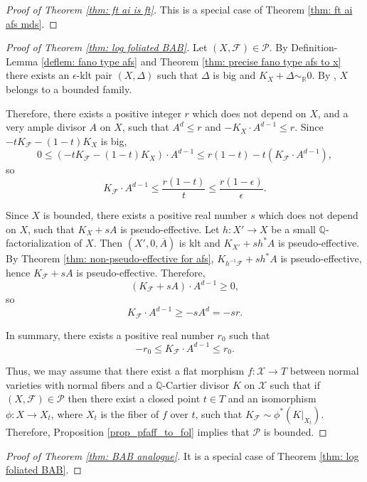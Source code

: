 \documentclass[12pt]{amsart}
\numberwithin{equation}{section}
\newcommand{\Ff}{\mathcal{F}}
\theoremstyle{definition}
\theoremstyle{definition}
\theoremstyle{definition}
\begin{document}
\begin{proof}[Proof of Theorem \ref{thm: ft ai is ft}]
  This is a special case of Theorem \ref{thm: ft ai afs mds}.
\end{proof}


\begin{proof}[Proof of Theorem \ref{thm: log foliated BAB}]
Let $(X,\mathcal F)\in \mathcal P$. 
By Definition-Lemma \ref{deflem: fano type afs} and Theorem \ref{thm: precise fano type afs to x} there exists an $\epsilon$-klt pair $(X,\Delta)$ such that $\Delta$ is big and $K_X+\Delta\sim_{\mathbb R}0$. By \cite[Corollary 1.4]{Bir21}, $X$ belongs to a bounded family. 

Therefore, there exists a positive integer $r$ which does not depend on $X$, and a very ample divisor $A$ on $X$, such that $A^d\leq r$ and $-K_X\cdot A^{d-1}\leq r$. Since $-tK_{\Ff}-(1-t)K_X$ is big,
$$0\leq (-tK_{\Ff}-(1-t)K_X)\cdot A^{d-1}\leq r(1-t)-t(K_{\Ff}\cdot A^{d-1}),$$
so
$$K_{\Ff}\cdot A^{d-1}\leq \frac{r(1-t)}{t}\leq\frac{r(1-\epsilon)}{\epsilon}.$$

Since $X$ is bounded, there exists a positive real number $s$ which does not depend on $X$, such that $K_X+sA$ is pseudo-effective. Let $h: X'\rightarrow X$ be a small $\mathbb Q$-factorialization of $X$. Then $(X',0,\overline{A})$ is klt and $K_{X'}+sh^*A$ is pseudo-effective. By Theorem \ref{thm: non-pseudo-effective for afs}, $K_{h^{-1}\Ff}+sh^*A$ is pseudo-effective, hence $K_{\Ff}+sA$ is pseudo-effective. Therefore,
$$(K_{\Ff}+sA)\cdot A^{d-1}\geq 0,$$
so
$$K_{\Ff}\cdot A^{d-1}\geq -sA^d=-sr.$$

In summary, there exists a positive real number $r_0$ such that
$$-r_0\leq K_{\Ff}\cdot A^{d-1}\leq r_0.$$


Thus, we may assume that there exist a flat morphism  
$f\colon \mathscr{X} \to T$ 
between normal varieties with normal fibers
and a $\mathbb Q$-Cartier divisor $K$ on $\mathscr{X}$ such that if $(X,\mathcal F)\in \mathcal P$ then 
 there exist a closed point $t\in T$ and an isomorphism $\phi\colon X\to X_t$, where $X_t$ is the fiber of $f$ over $t$, such that $K_{\mathcal F}\sim \phi^*(K|_{X_t})$. Therefore, 
Proposition \ref{prop_pfaff_to_fol} implies that $\mathcal P$ is bounded.
\end{proof}




\begin{proof}[Proof of Theorem \ref{thm: BAB analogue}]
 It is a special case of Theorem \ref{thm: log foliated BAB}.   
\end{proof}
\end{document}
